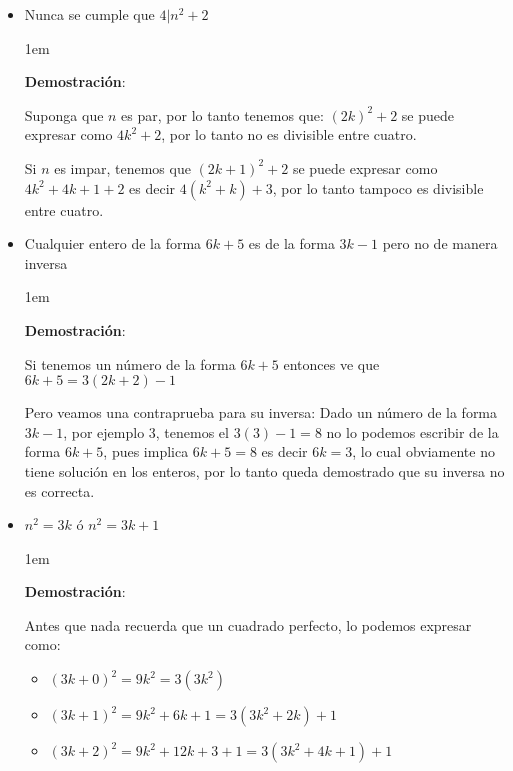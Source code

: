 \documentclass[12pt, fleqn]{report}                             %
\newenvironment{SmallIndentation}[1][0.75em]                    %
    {\begin{adjustwidth}{#1}{}\begin{footnotesize}}                 %
    {\end{footnotesize}\end{adjustwidth}}                           %
\begin{document}
\begin{itemize}
\begin{SmallIndentation}[1em]
                \end{SmallIndentation}

            \item Nunca se cumple que $4|n^2 +2$

                \begin{SmallIndentation}[1em]
                    \textbf{Demostración}:

                    Suponga que $n$ es par, por lo tanto tenemos que:
                    $(2k)^2+2$ se puede expresar como $4k^2 + 2$, por lo tanto no es divisible entre
                    cuatro.

                    Si $n$ es impar, tenemos que $(2k+1)^2+2$ se puede expresar como $4k^2 + 4k + 1 + 2$
                    es decir $4(k^2+k) +3$, por lo tanto tampoco es divisible entre cuatro.

                \end{SmallIndentation}

            \item Cualquier entero de la forma $6k+5$ es de la forma $3k-1$ pero no de manera inversa

                \begin{SmallIndentation}[1em]
                    \textbf{Demostración}:

                    Si tenemos un número de la forma $6k+5$ entonces ve que $6k+5 = 3(2k+2)-1$

                    Pero veamos una contraprueba para su inversa:
                    Dado un número de la forma $3k-1$, por ejemplo 3, tenemos el $3(3)-1=8$ no lo
                    podemos escribir de la forma $6k+5$, pues implica $6k+5=8$ es decir
                    $6k=3$, lo cual obviamente no tiene solución en los enteros, por lo tanto
                    queda demostrado que su inversa no es correcta.
                    
                \end{SmallIndentation}

            \item $n^2 = 3k$ ó $n^2 = 3k + 1$

                \begin{SmallIndentation}[1em]
                    \textbf{Demostración}:

                    Antes que nada recuerda que un cuadrado perfecto, lo podemos expresar como:
                    \begin{itemize}
                        \item $(3k+0)^2 = 9k^2 = 3(3k^2)$
                        \item $(3k+1)^2 = 9k^2 + 6k + 1 = 3(3k^2 + 2k) + 1$
                        \item $(3k+2)^2 = 9k^2 + 12k + 3 +1 = 3(3k^2 + 4k + 1) + 1$
                    \end{itemize}


\end{SmallIndentation}
\end{itemize}
\end{document}
